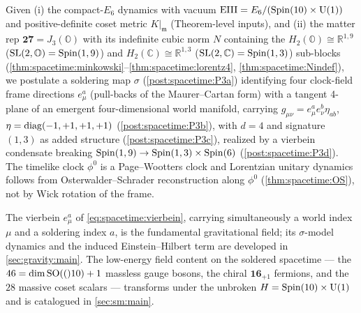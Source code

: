 \begin{postulate}\label{post:spacetime:P3master}
Given (i) the compact-$E_6$ dynamics with vacuum $\mathrm{EIII}=E_6/(\operatorname{Spin}(10)\times\mathrm{U}(1))$ and
positive-definite coset metric $K|_{\mathfrak m}$ (Theorem-level inputs), and (ii) the
matter rep $\mathbf{27}=J_3(\mathbb O)$ with its indefinite cubic norm $N$ containing the
$H_2(\mathbb O)\cong\mathbb R^{1,9}$ ($\mathrm{SL}(2,\mathbb O)=\operatorname{Spin}(1,9)$) and
$H_2(\mathbb C)\cong\mathbb R^{1,3}$ ($\mathrm{SL}(2,\mathbb C)=\operatorname{Spin}(1,3)$) sub-blocks
(\autoref{thm:spacetime:minkowski}--\autoref{thm:spacetime:lorentz4},
\autoref{thm:spacetime:Nindef}), we postulate a soldering map $\sigma$
(\autoref{post:spacetime:P3a}) identifying four clock-field frame directions $e^a_\mu$
(pull-backs of the Maurer--Cartan form) with a tangent 4-plane of an emergent
four-dimensional world manifold, carrying $g_{\mu\nu}=e^a_\mu e^b_\nu\eta_{ab}$,
$\eta=\operatorname{diag}(-1,+1,+1,+1)$ (\autoref{post:spacetime:P3b}), with $d=4$ and signature
$(1,3)$ as added structure (\autoref{post:spacetime:P3c}), realized by a vierbein
condensate breaking $\operatorname{Spin}(1,9)\to\operatorname{Spin}(1,3)\times\operatorname{Spin}(6)$
(\autoref{post:spacetime:P3d}). The timelike clock $\phi^0$ is a Page--Wootters clock
and Lorentzian unitary dynamics follows from Osterwalder--Schrader reconstruction along
$\phi^0$ (\autoref{thm:spacetime:OS}), not by Wick rotation of the frame.
\end{postulate}

The vierbein $e^a_\mu$ of \eqref{eq:spacetime:vierbein}, carrying simultaneously a
world index $\mu$ and a soldering index $a$, is the fundamental gravitational field; its
$\sigma$-model dynamics and the induced Einstein--Hilbert term are developed in
\autoref{sec:gravity:main}. The low-energy field content on the soldered spacetime ---
the $46=\dim\mathrm{SO}(()10)+1$ massless gauge bosons, the chiral $\mathbf{16}_{+1}$ fermions,
and the $28$ massive coset scalars --- transforms under the unbroken
$H=\operatorname{Spin}(10)\times\mathrm{U}(1)$ and is catalogued in \autoref{sec:sm:main}.
